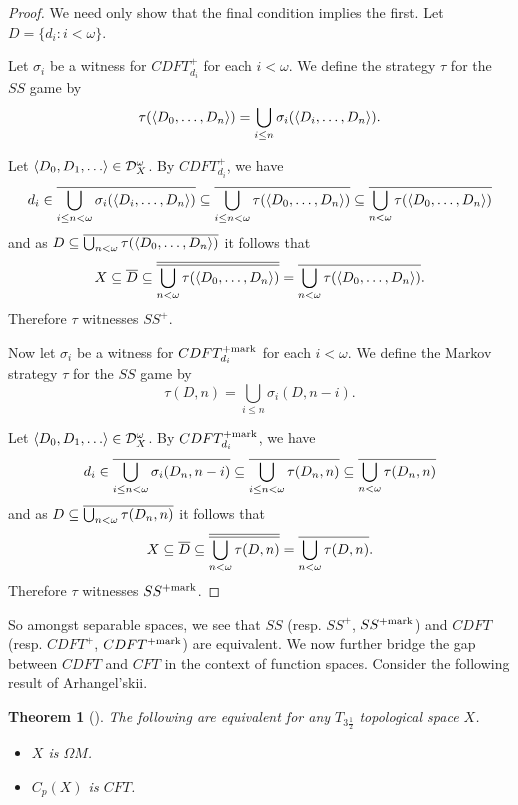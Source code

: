 \documentclass{amsart}
\theoremstyle{plain}
\newtheorem{theorem}{Theorem}
\theoremstyle{definition}
\theoremstyle{remark}
\theoremstyle{plain}
\theoremstyle{definition}
\theoremstyle{remark}
\begin{document}
\begin{proof}
  We need only show that the final condition implies the first.
  Let \(D=\{d_i:i<\omega\}\).

  Let \(\sigma_i\) be a witness for \(CDFT_{d_i}^+\)
  for each \(i<\omega\). We define the strategy \(\tau\) for the
  \(SS\) game by
  \[
    \tau(\langle D_0,\dots,D_n\rangle)
      =
    \bigcup_{i\leq n}
    \sigma_i(\langle D_i,\dots,D_n\rangle)
  .\]

  Let \(\<D_0,D_1,\dots\>\in\mc D_X^\omega\).
  By \(CDFT_{d_i}^+\), we have
  \[
    d_i
      \in
    \overline{\bigcup_{i\leq n<\omega}\sigma_i(\langle D_i,\dots,D_n\rangle)}
      \subseteq
    \overline{\bigcup_{i\leq n<\omega}\tau(\langle D_0,\dots,D_n\rangle)}
      \subseteq
    \overline{\bigcup_{n<\omega}\tau(\langle D_0,\dots,D_n\rangle)}
  \]
  and as \(D\subseteq\overline{\bigcup_{n<\omega}\tau(\langle D_0,\dots,D_n\rangle)}\)
  it follows that
  \[
    X
      \subseteq
    \overline{D}
      \subseteq
    \overline{\overline{\bigcup_{n<\omega}\tau(\langle D_0,\dots,D_n\rangle)}}
      =
    \overline{\bigcup_{n<\omega}\tau(\langle D_0,\dots,D_n\rangle)}
  .\]
  Therefore \(\tau\) witnesses \(SS^+\).

  Now let \(\sigma_i\) be a witness for \(CDFT_{d_i}^{+\mathrm{mark}}\)
  for each \(i<\omega\). We define the Markov strategy \(\tau\) for the
  \(SS\) game by
  \[
    \tau(D,n)
      =
    \bigcup_{i\leq n}
    \sigma_i(D,n-i)
  .\]

  Let \(\<D_0,D_1,\dots\>\in\mc D_X^\omega\).
  By \(CDFT_{d_i}^{+\mathrm{mark}}\), we have
  \[
    d_i
      \in
    \overline{\bigcup_{i\leq n<\omega}\sigma_i(D_n,n-i)}
      \subseteq
    \overline{\bigcup_{i\leq n<\omega}\tau(D_n,n)}
      \subseteq
    \overline{\bigcup_{n<\omega}\tau(D_n,n)}
  \]
  and as \(D\subseteq\overline{\bigcup_{n<\omega}\tau(D_n,n)}\)
  it follows that
  \[
    X
      \subseteq
    \overline{D}
      \subseteq
    \overline{\overline{\bigcup_{n<\omega}\tau(D,n)}}
      =
    \overline{\bigcup_{n<\omega}\tau(D,n)}
  .\]
  Therefore \(\tau\) witnesses \(SS^{+\mathrm{mark}}\).
\end{proof}

So amongst separable spaces, we see that \(SS\)
(resp. \(SS^+\), \(SS^{+\mathrm{mark}}\)) and
\(CDFT\) (resp. \(CDFT^+\), \(CDFT^{+\mathrm{mark}}\))
are equivalent. We now further bridge the gap between \(CDFT\)
and \(CFT\) in the context of function spaces.
Consider the following result of Arhangel'skii.

\begin{theorem}[\cite{MR837289}]
  The following are equivalent for any \(T_{3\frac{1}{2}}\)
  topological space \(X\).
    \begin{itemize}
      \item \(X\) is \(\Omega M\).
      \item \(C_p(X)\) is \(CFT\).
    \end{itemize}
\end{theorem}
\end{document}
